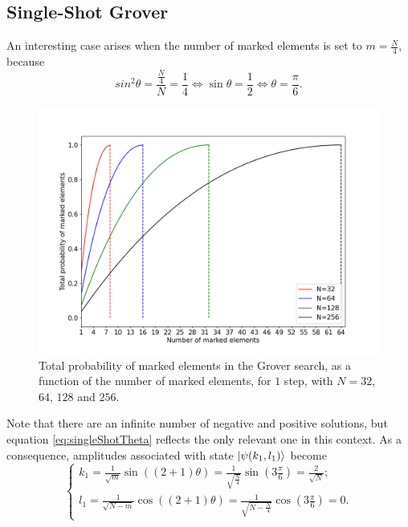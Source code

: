 \documentclass[../../dissertation.tex]{subfiles}
\begin{document}
\subsection{Single-Shot Grover}
An interesting case arises when the number of marked elements is set to $m=\frac{N}{4}$, because 
\begin{equation}
	sin^2\theta = \frac{\frac{N}{4}}{N} = \frac{1}{4} \iff \sin\theta = \frac{1}{2} \iff \theta = \frac{\pi}{6}. 
	\label{eq:singleShotTheta}
\end{equation}
\begin{figure}[h]
	\centering
	\includegraphics[scale=0.40]{img/Grover/GroverSingleShot3264128256}
	\caption{Total probability of marked elements in the Grover search, as a function of the number of marked elements, for $1$ step, with $N=32$, $64$, $128$ and $256$.} 
	\label{GroverSingleShot3264128256}
\end{figure}
Note that there are an infinite number of negative and positive solutions, but
equation \eqref{eq:singleShotTheta} reflects the only relevant one in this
context. As a consequence, amplitudes associated with state
$\ket{\psi(k_1,l_1)}$ become 
\begin{equation}
	\begin{cases}
		k_{1} = \frac{1}{\sqrt{m}} \sin{((2+1)\theta)} = \frac{1}{\sqrt{\frac{N}{4}}} \sin{(3\frac{\pi}{6})} = \frac{2}{\sqrt{N}};
		\\l_{1} = \frac{1}{\sqrt{N-m}}\cos{((2+1)\theta)} = \frac{1}{\sqrt{N-\frac{N}{4}}}\cos{(3\frac{\pi}{6})} = 0.
	\end{cases}\label{eq:groverSingleShotKandJ}
\end{equation}
\end{document}
